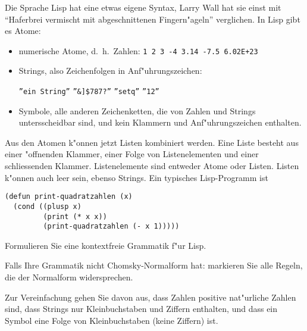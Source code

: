 Die Sprache Lisp hat eine etwas eigene Syntax, Larry Wall hat sie einst
mit ``Haferbrei vermischt mit abgeschnittenen Fingern"ageln'' verglichen.
In Lisp gibt es Atome:
\begin{itemize}
\item numerische Atome, d.~h.~Zahlen: {\tt 1 2 3
-4  3.14  -7.5  6.02E+23}
\item Strings, also Zeichenfolgen in Anf"uhrungszeichen:
\begin{center}
{\tt \textquotedblright ein String\textquotedblright}
{\tt \textquotedblright \&]\$787?\textquotedblright}
{\tt \textquotedblright setq\textquotedblright}
{\tt \textquotedblright 12\textquotedblright}
\end{center}
\item Symbole, alle anderen Zeichenketten, die von Zahlen und Strings
untersscheidbar sind, und kein Klammern und Anf"uhrungszeichen enthalten.
\end{itemize}
Aus den Atomen k"onnen jetzt Listen kombiniert werden. Eine Liste besteht
aus einer "offnenden Klammer, einer Folge von Listenelementen und
einer schliessenden Klammer. Listenelemente sind entweder Atome oder Listen.
Listen k"onnen auch leer sein, ebenso Strings.
Ein typisches Lisp-Programm ist
\begin{verbatim}
(defun print-quadratzahlen (x)
  (cond ((plusp x)
         (print (* x x))
         (print-quadratzahlen (- x 1)))))
\end{verbatim}
\begin{teilaufgaben}
\item
Formulieren Sie eine kontextfreie Grammatik f"ur Lisp.
\item
Falls Ihre Grammatik nicht Chomsky-Normalform hat: markieren Sie
alle Regeln, die der Normalform widersprechen.
\end{teilaufgaben}

\begin{hinweis}
Zur Vereinfachung gehen Sie davon aus, dass Zahlen positive nat"urliche
Zahlen sind, dass Strings nur Kleinbuchstaben und Ziffern enthalten, und
dass ein Symbol eine Folge von Kleinbuchstaben (keine Ziffern) ist.
\end{hinweis}

